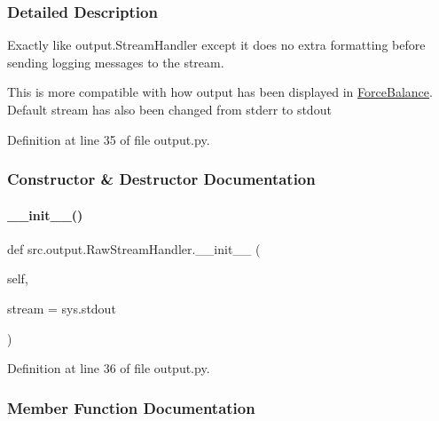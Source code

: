 \subsubsection{Detailed Description}
Exactly like output.\+Stream\+Handler except it does no extra formatting before sending logging messages to the stream. 

This is more compatible with how output has been displayed in \hyperlink{namespaceForceBalance}{Force\+Balance}. Default stream has also been changed from stderr to stdout 

Definition at line 35 of file output.\+py.



\subsubsection{Constructor \& Destructor Documentation}
\mbox{\label{classsrc_1_1output_1_1RawStreamHandler_a2f035ce15bd29cf3ec83feed4890b5fe}} 
\paragraph{\texorpdfstring{\+\_\+\+\_\+init\+\_\+\+\_\+()}{\_\_init\_\_()}}
{\footnotesize\ttfamily def src.\+output.\+Raw\+Stream\+Handler.\+\_\+\+\_\+init\+\_\+\+\_\+ (\begin{DoxyParamCaption}\item[{}]{self,  }\item[{}]{stream = {\ttfamily sys.stdout} }\end{DoxyParamCaption})}



Definition at line 36 of file output.\+py.



\subsubsection{Member Function Documentation}
\mbox{\label{classsrc_1_1output_1_1RawStreamHandler_af9bdcbbd359a73a03f547a8da516b009}} 
